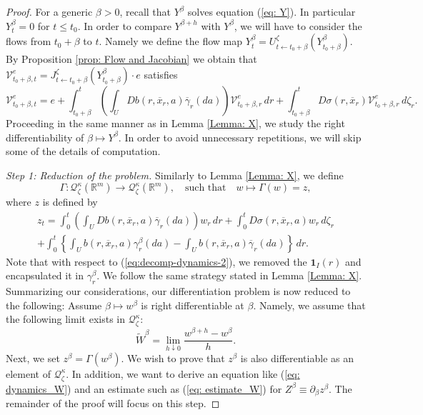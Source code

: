 \documentclass[12pt,reqno]{amsart}
\numberwithin{equation}{section}  %
\newcommand{\1}{{\bf 1}}
\newcommand{\2}{{\bf 2}}
\newcommand{\R}{\mathbb R}
\newcommand{\ga}{\gamma}
\newcommand{\ka}{\kappa}
\newcommand{\lp}{\left(}
\newcommand{\rp}{\right)}
\theoremstyle{remark}
\theoremstyle{remark}
\begin{document}
\begin{proof}
For a generic $\beta>0$, recall that $Y^{\beta}$ solves equation (\ref{eq: Y}). In particular $Y^{\beta}_{t}=0$ for $t\leq t_{0}$. In order to compare $Y^{\beta+h}$ with $Y^{\beta}$, we will have to consider the flows from $t_{0}+\beta$  to $t$. Namely we define the flow map $Y_{t}^{\beta}=U_{t\leftarrow t_{0}+\beta}^{\zeta}(Y_{t_{0}+\beta}^{\beta})$. By Proposition \ref{prop: Flow and Jacobian} we obtain that $\mathcal{V}_{t_{0}+\beta,t}^{e}=J_{t\leftarrow t_{0}+\beta}^{\zeta}(Y^{\beta}_{t_{0}+\beta})\cdot e$ satisfies
   \begin{equation}\label{eq: Jacobian for Y}\mathcal{V}_{t_{0}+\beta,t}^{e}=e+\int_{t_{0}+\beta}^{t} \lp \int_{U}Db(r,\overline{x}_{r},a)\overline{\ga}_{r}(da)\rp \mathcal{V}_{t_{0}+\beta,r}^{e}\,dr +\int_{t_{0}+\beta}^{t}D\sigma(r,\overline{x}_{r})\mathcal{V}_{t_{0}+\beta,r}^{e}\,d\zeta_{r}. \end{equation}
Proceeding in the same manner as in Lemma  \ref{Lemma: X}, we study the right differentiability of $\beta \mapsto Y^{\beta}$. In order to avoid unnecessary repetitions, we will skip some of the details of computation.

\smallskip
\noindent
\textit{Step 1: Reduction of the problem.} Similarly to Lemma \ref{Lemma: X}, we define
\begin{equation*}
    \Gamma \colon \mathcal{Q}_{\zeta}^{\ka}(\R^m) \longrightarrow \mathcal{Q}_{\zeta}^{\ka}(\R^m), \quad \text{such that}\quad w\longmapsto \Gamma(w)=z,
\end{equation*}
where $z$ is defined by
\begin{multline*}
    z_{t}=\int_{0}^{t}\lp \int_{U}Db(r,\overline{x}_{r},a)\overline{\ga}_{r}(da)\rp w_{r}\,dr +\int_{0}^{t}D\sigma(r,\overline{x}_{r},a)w_{r}\,d\zeta_{r}\\+
    \int_{0}^{t}\left\{\int_{U}b(r,\overline{x}_{r},a)\ga_{r}^{\beta}(da)-\int_{U}b(r,\overline{x}_{r},a)\overline{\ga}_{r}(da) \right\}\,dr.
\end{multline*}
Note that with respect to (\ref{eq:decomp-dynamics-2}), we removed the $\mathbf{1}_{I}(r)$ and encapsulated it in $\ga^{\beta}_{r}$.
We follow the same strategy stated in Lemma \ref{Lemma: X}. Summarizing our considerations, our differentiation problem is now reduced to the following: Assume $\beta \mapsto w^{\beta}$ is right differentiable at $\beta$. Namely, we assume that the following limit exists in $\mathcal{Q}_{\zeta}^{\ka}$:
\begin{equation}
    \tilde{W}^{\beta}=\lim_{h\downarrow 0}\frac{w^{\beta+h}-w^{\beta}}{h}.
\end{equation}
Next, we set $z^{\beta}=\Gamma(w^{\beta})$. We wish to prove that $z^{\beta}$ is also differentiable as an element of $\mathcal{Q}_{\zeta}^{\ka}$. In addition, we want to derive an equation like (\ref{eq: dynamics_W}) and an estimate such as (\ref{eq: estimate_W}) for $Z^{\beta}\equiv \partial_{\beta}z^{\beta}$. The remainder of the proof will focus on this step.


\end{proof}
\end{document}
